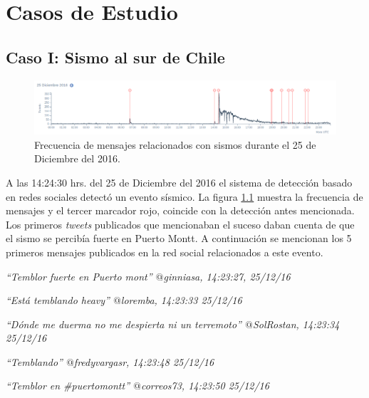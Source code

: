 \chapter{Casos de Estudio}
\label{cap:casos}

	\section{Caso I: Sismo al sur de Chile}	
	
	\begin{figure}[!h]
	  \centering
	  \includegraphics[width=\textwidth]{imagenes/img-25Dic-freq.png}
	  \caption{Frecuencia de mensajes relacionados con sismos durante el 25 de Diciembre del 2016.}
		\label{fig:timeline-25Dic}
	\end{figure}
	
	
	A las 14:24:30 hrs. del 25 de Diciembre del 2016 el sistema de detección basado en redes sociales detectó  un evento sísmico. La figura \ref{fig:timeline-25Dic} muestra la frecuencia de mensajes y el tercer marcador rojo, coincide con la detección antes mencionada. Los primeros \textit{tweets} publicados que mencionaban el suceso daban cuenta de que el sismo se percibía fuerte en Puerto Montt. A continuación se mencionan los 5 primeros mensajes publicados en la red social relacionados a este evento. 


\textit{``Temblor fuerte en Puerto mont'' $@$ginniasa, 14:23:27, 25/12/16}

\textit{``Está temblando heavy'' $@$loremba, 14:23:33 25/12/16}

\textit{``Dónde me duerma no me despierta ni un terremoto'' $@$SolRostan, 14:23:34 25/12/16}

\textit{``Temblando'' $@$fredyvargasr, 14:23:48 25/12/16}

\textit{``Temblor en \#puertomontt'' $@$correos73, 14:23:50 25/12/16}

